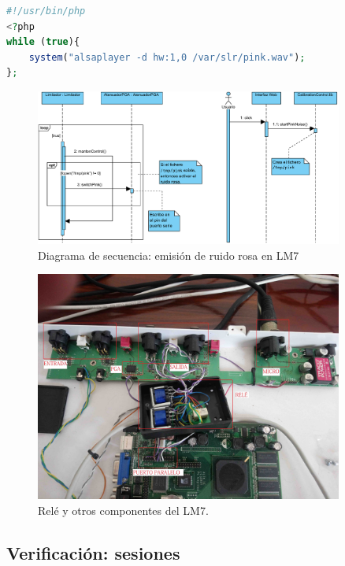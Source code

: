 \begin{lstlisting}[language=php, label={lst:pink}, caption=Script de emisión continuo de ruido rosa.]
#!/usr/bin/php
<?php
while (true){
	system("alsaplayer -d hw:1,0 /var/slr/pink.wav");
};
\end{lstlisting}


\begin{figure}[h]
    \centering
    \includegraphics[width=0.9\textwidth]{figuras/lms7-pink-noise-generation.pdf}
    \caption{Diagrama de secuencia: emisión de ruido rosa en \acrshort{LM7}}
    \label{fig:lm7-pink-noise}
\end{figure}

\begin{figure}[h]
    \centering
    \includegraphics[width=0.9\textwidth]{imagenes/lm7-fotos/lms7-rele.jpg}
    \caption{Relé y otros componentes del \acrshort{LM7}.}
    \label{img:lm7-rele}
\end{figure}


\clearpage
\subsection{Verificación: sesiones} \label{sec:lms7-sesiones}

